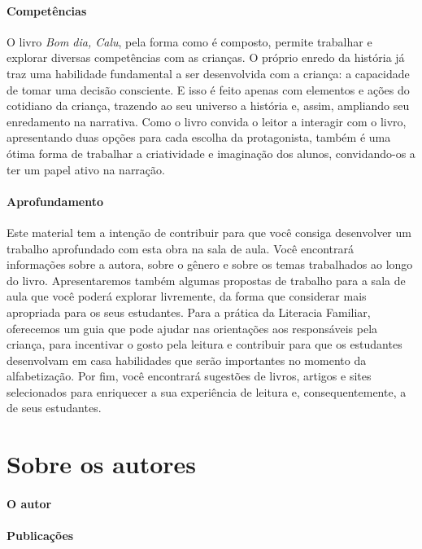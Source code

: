 \documentclass[11pt]{extarticle}
\begin{document}
\paragraph{Competências}
O livro \textit{Bom dia, Calu}, pela forma como é composto, permite trabalhar e explorar diversas competências com as crianças. O próprio enredo da história já traz uma habilidade fundamental a ser desenvolvida com a criança: a capacidade de tomar uma decisão consciente. E isso é feito apenas com elementos e ações do cotidiano da criança, trazendo ao seu universo a história e, assim, ampliando seu enredamento na narrativa. Como o livro convida o leitor a interagir com o livro, apresentando duas opções para cada escolha da protagonista, também é uma ótima forma de trabalhar a criatividade e imaginação dos alunos, convidando-os a ter um papel ativo na narração.


\paragraph{Aprofundamento} Este material tem a 
intenção de contribuir para que você consiga desenvolver um trabalho aprofundado 
com esta obra na sala de aula. Você encontrará informações sobre a autora, sobre 
o gênero e sobre os temas trabalhados ao longo do livro. Apresentaremos também 
algumas propostas de trabalho para a sala de aula que você poderá explorar livremente, 
da forma que considerar mais apropriada para os seus estudantes. Para a prática 
da Literacia Familiar, oferecemos um guia que pode ajudar nas orientações aos 
responsáveis pela criança, para incentivar o gosto pela leitura e contribuir para 
que os estudantes desenvolvam em casa habilidades que serão importantes no momento 
da alfabetização. Por fim, você encontrará sugestões de livros, artigos e sites 
selecionados para enriquecer a sua experiência de leitura e, 
consequentemente, a de seus estudantes.



\section{Sobre os autores}

\paragraph{O autor} 

\paragraph{Publicações}
\end{document}
